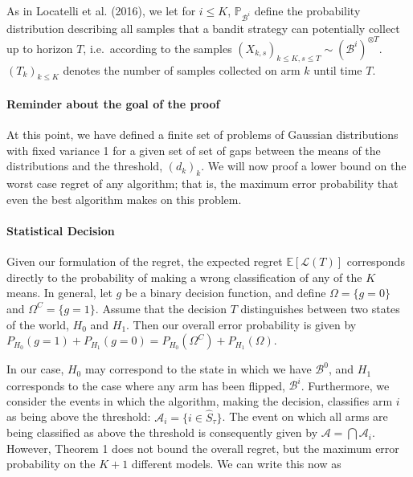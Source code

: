 \documentclass[12pt,]{article}
\let\oldparagraph\paragraph
\renewcommand{\paragraph}[1]{\oldparagraph{#1}\mbox{}}
\begin{document}
As in Locatelli et al. (2016), we let for \(i \leq K\),
\(\mathbb{P}_{\mathcal{B}^i}\) define the probability distribution
describing all samples that a bandit strategy can potentially collect up
to horizon \(T\), i.e.~according to the samples
\((X_{k,s})_{k\leq K, s \leq T} \sim (\mathcal{B}^i)^{\otimes T}\).
\((T_k)_{k\leq K}\) denotes the number of samples collected on arm \(k\)
until time \(T\).

\paragraph{Reminder about the goal of the
proof}\label{reminder-about-the-goal-of-the-proof}

At this point, we have defined a finite set of problems of Gaussian
distributions with fixed variance 1 for a given set of set of gaps
between the means of the distributions and the threshold, \((d_k)_k\).
We will now proof a lower bound on the worst case regret of any
algorithm; that is, the maximum error probability that even the best
algorithm makes on this problem.

\paragraph{Statistical Decision}\label{statistical-decision}

Given our formulation of the regret, the expected regret
\(\mathbb{E}[\mathcal{L}(T)]\) corresponds directly to the probability
of making a wrong classification of any of the \(K\) means. In general,
let \(g\) be a binary decision function, and define
\(\Omega = \{g = 0\}\) and \(\Omega^C = \{g = 1\}\). Assume that the
decision \(T\) distinguishes between two states of the world, \(H_0\)
and \(H_1\). Then our overall error probability is given by
\(P_{H_0}(g=1) + P_{H_1}(g = 0) = P_{H_0}(\Omega^C) + P_{H_1}(\Omega)\).

In our case, \(H_0\) may correspond to the state in which we have
\(\mathcal{B}^0\), and \(H_1\) corresponds to the case where any arm has
been flipped, \(\mathcal{B}^i\). Furthermore, we consider the events in
which the algorithm, making the decision, classifies arm \(i\) as being
above the threshold: \(\mathcal{A}_i = \{i \in \hat{S}_\tau\}\). The
event on which all arms are being classified as above the threshold is
consequently given by \(\mathcal{A} = \bigcap \mathcal{A}_i\). However,
Theorem 1 does not bound the overall regret, but the maximum error
probability on the \(K+1\) different models. We can write this now as
\end{document}
